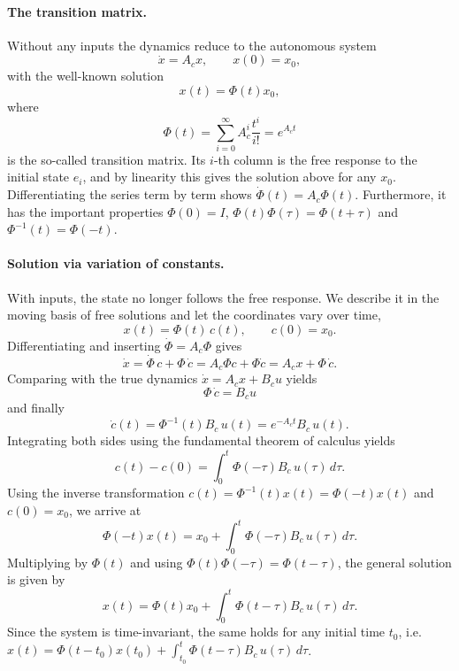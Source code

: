 \paragraph{The transition matrix.}
Without any inputs the dynamics reduce to the autonomous system
\[
  \dot{x} = A_c x, \qquad x(0)=x_0,
\]
with the well-known solution
\[
  x(t) = \Phi(t)x_0 ,
\]
where
\[
  \Phi(t) = \sum_{i=0}^{\infty} A_c^i \frac{t^i}{i!} = e^{A_c t}
\]
is the so-called transition matrix.
Its $i$-th column is the free response to the initial state $e_i$, and by linearity this gives the solution above for any $x_0$.
Differentiating the series term by term shows $\dot{\Phi}(t) = A_c \Phi(t)$.
Furthermore, it has the important properties $\Phi(0)=I$, $\Phi(t)\Phi(\tau)=\Phi(t+\tau)$ and $\Phi^{-1}(t)=\Phi(-t)$.

\paragraph{Solution via variation of constants.}
With inputs, the state no longer follows the free response.
We describe it in the moving basis of free solutions and let the coordinates vary over time,
\[
  x(t) = \Phi(t)\, c(t), \qquad c(0) = x_0.
\]
Differentiating and inserting $\dot{\Phi} = A_c \Phi$ gives
\[
  \dot{x} = \dot{\Phi}\, c + \Phi\, \dot{c} = A_c \Phi c + \Phi \dot{c} = A_c x + \Phi\, \dot{c} .
\]
Comparing with the true dynamics $\dot{x} = A_c x + B_c u$ yields
\[
  \Phi\,\dot{c} = B_c u
\]
and finally
\[
    \dot{c}(t) = \Phi^{-1}(t) B_c\, u(t) = e^{-A_ct} B_c\, u(t) .
\]
Integrating both sides using the fundamental theorem of calculus yields
\[
    c(t) - c(0) = \int_0^{t} \Phi(-\tau) B_c\, u(\tau)\, d\tau .
\]
Using the inverse transformation $c(t)=\Phi^{-1}(t)x(t)=\Phi(-t)x(t)$ and $c(0) = x_0$, we arrive at
\[
    \Phi(-t)x(t) = x_0 + \int_0^{t} \Phi(-\tau) B_c\, u(\tau)\, d\tau .
\]
Multiplying by $\Phi(t)$ and using $\Phi(t)\Phi(-\tau) = \Phi(t-\tau)$, the general solution is given by
\[
    x(t) = \Phi(t)x_0 + \int_0^{t} \Phi(t-\tau) B_c\, u(\tau)\, d\tau .
\]
Since the system is time-invariant, the same holds for any initial time $t_0$, i.e.\ $x(t) = \Phi(t-t_0)x(t_0) + \int_{t_0}^{t} \Phi(t-\tau) B_c\, u(\tau)\, d\tau$.


